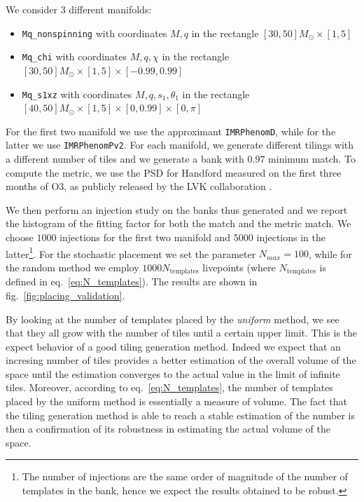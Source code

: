 \documentclass[twocolumn,showpacs,preprintnumbers,nofootinbib,prd,
superscriptaddress,10pt]{revtex4-2}
\begin{document}
We consider 3 different manifolds:
\begin{itemize}
	\item \texttt{Mq\_nonspinning} with coordinates $M, q$ in the rectangle $[30, 50] M_\odot \times [1,5]$
	\item \texttt{Mq\_chi} with coordinates $M, q, \chi $ in the rectangle $[30, 50] M_\odot \times [1,5] \times [-0.99, 0.99]$
	\item \texttt{Mq\_s1xz} with coordinates $M, q, s_{1}, \theta_1$ in the rectangle $[40, 50] M_\odot \times [1,5] \times [0, 0.99] \times [0,\pi]$
\end{itemize}
For the first two manifold we use the approximant \texttt{IMRPhenomD}, while for the latter we use \texttt{IMRPhenomPv2}.
For each manifold, we generate different tilings with a different number of tiles and we generate a bank with $0.97$ minimum match.
To compute the metric, we use the PSD for Handford measured on the first three months of O3, as publicly released by the LVK collaboration \cite{https://dcc.ligo.org/LIGO-T2000012/public}.

We then perform an injection study on the banks thus generated and we report the histogram of the fitting factor for both the match and the metric match. We choose $1000$ injections for the first two manifold and $5000$ injections in the latter\footnote{
The number of injections are the same order of magnitude of the number of templates in the bank, hence we expect the results obtained to be robust.}.
For the stochastic placement we set the parameter $N_{max} = 100$, while for the random method we employ $1000 N_{\text{templates}}$ livepoints (where $N_{\text{templates}}$ is defined in eq.~\eqref{eq:N_templates}).
The results are shown in fig.~\ref{fig:placing_validation}.

By looking at the number of templates placed by the {\it uniform} method, we see that they all grow with the number of tiles until a certain upper limit. This is the expect behavior of a good tiling generation method. Indeed we expect that an incresing number of tiles provides a better estimation of the overall volume of the space until the estimation converges to the actual value in the limit of infinite tiles. Moreover, according to eq.~\eqref{eq:N_templates}, the number of templates placed by the uniform method is essentially a measure of volume.
The fact that the tiling generation method is able to reach a stable estimation of the number is then a confirmation of its robustness in estimating the actual volume of the space.
\end{document}
